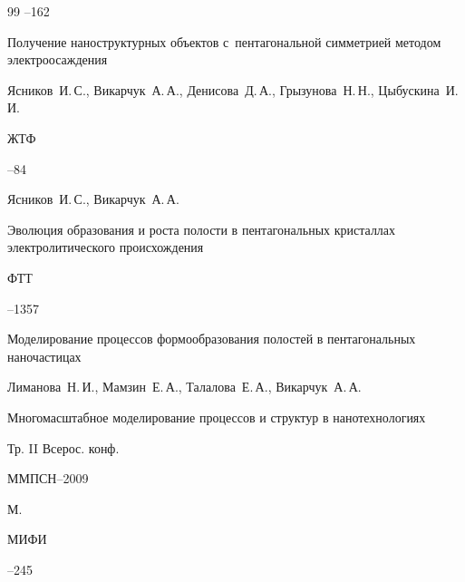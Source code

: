 \begin{thebibliography}{99}
--162




\paper Получение наноструктурных объектов с~пентагональной симметрией методом электроосаждения

\by Ясников~И.\,С., Викарчук~А.\,А., Денисова~Д.\,А., Грызунова~Н.\,Н., Цыбускина~И.\,И.

\jour ЖТФ




--84




\by Ясников~И.\,С.,  Викарчук~А.\,А.

\paper Эволюция образования и роста полости в пентагональных кристаллах электролитического происхождения

\jour ФТТ




--1357




\paper Моделирование процессов формообразования полостей в пентагональных наночастицах

\by Лиманова~Н.\,И., Мамзин~Е.\,А., Талалова~Е.\,А., Викарчук~А.\,А.

\inbook Многомасштабное моделирование процессов и структур в нанотехнологиях

\bookinfo Тр. II Всерос. конф.

\procinfo ММПСН--2009

\publaddr М.

\publ МИФИ


--245

\end{thebibliography}



\newpage



\makeengtitlem




% 

